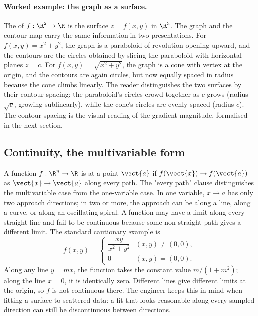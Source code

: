 \paragraph{Worked example: the graph as a surface.} The
 of $f : \R^{2} \to \R$ is the surface $z = f(x, y)$
in $\R^{3}$. The graph and the contour map carry the same
information in two presentations. For $f(x, y) = x^{2} + y^{2}$, the
graph is a paraboloid of revolution opening upward, and the contours
are the circles obtained by slicing the paraboloid with horizontal
planes $z = c$. For $f(x, y) = \sqrt{x^{2} + y^{2}}$, the graph is a
cone with vertex at the origin, and the contours are again circles,
but now equally spaced in radius because the cone climbs linearly.
The reader distinguishes the two surfaces by their contour spacing:
the paraboloid's circles crowd together as $c$ grows (radius
$\sqrt{c}$, growing sublinearly), while the cone's circles are evenly
spaced (radius $c$). The contour spacing is the visual reading of
the gradient magnitude, formalised in the next section.

\subsection{Continuity, the multivariable form}

A function $f : \R^{n} \to \R$ is  at a point
$\vect{a}$ if $f(\vect{x}) \to f(\vect{a})$ as $\vect{x} \to
\vect{a}$ along every path. The "every path" clause distinguishes
the multivariable case from the one-variable case. In one variable,
$x \to a$ has only two approach directions; in two or more, the
approach can be along a line, along a curve, or along an oscillating
spiral. A function may have a limit along every straight line and
fail to be continuous because some non-straight path gives a
different limit. The standard cautionary example is
\[
f(x, y) =
\begin{cases}
\dfrac{xy}{x^{2} + y^{2}} & (x, y) \neq (0, 0), \\
0 & (x, y) = (0, 0).
\end{cases}
\]
Along any line $y = mx$, the function takes the constant value
$m / (1 + m^{2})$; along the line $x = 0$, it is identically zero.
Different lines give different limits at the origin, so $f$ is not
continuous there. The engineer keeps this in mind when fitting a
surface to scattered data: a fit that looks reasonable along every
sampled direction can still be discontinuous between directions.

